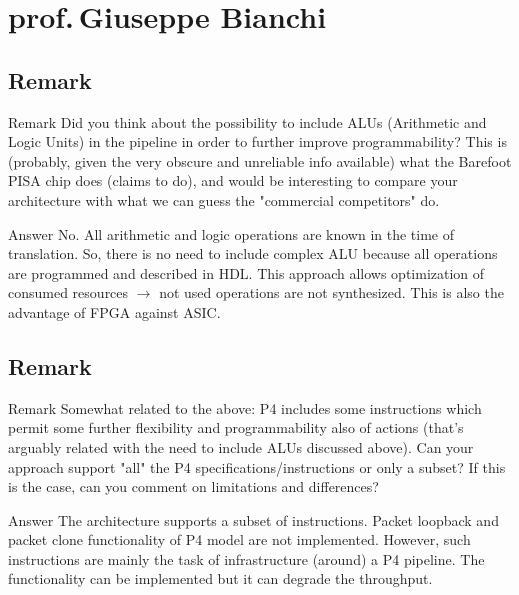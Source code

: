\section{prof.\,Giuseppe Bianchi}
\setcounter{RemarkCounter}{1}
\subsection{Remark \theRemarkCounter}
\begin{frame}[allowframebreaks]
    \begin{block}{Remark \theRemarkCounter}
        Did you think about the possibility to include ALUs (Arithmetic and Logic Units) in the
        pipeline in order to further improve programmability? This is (probably, given the very
        obscure and unreliable info available) what the Barefoot PISA chip does (claims to do), and
        would be interesting to compare your architecture with what we can guess the 
        "commercial competitors" do.
    \end{block}
    \begin{exampleblock}{Answer}
        No. All arithmetic and logic operations are known in the time of translation. So,
        there is no need to include complex ALU because all operations are programmed and described in HDL. 
        This approach allows optimization of consumed resources $\rightarrow$ not used operations are not synthesized.
        This is also the advantage of FPGA against ASIC.
    \end{exampleblock}
    
\end{frame}

\subsection{Remark \theRemarkCounter}
\begin{frame}[allowframebreaks]
    \begin{block}{Remark \theRemarkCounter}
        Somewhat related to the above: P4 includes some instructions which permit some further
        flexibility and programmability also of actions (that's arguably related with the need to
        include ALUs discussed above). Can your approach support "all" the P4
        specifications/instructions or only a subset? If this is the case, can you comment on
        limitations and differences?
    \end{block}
    
    \begin{exampleblock}{Answer}
        The architecture supports a subset of instructions. Packet loopback and packet clone functionality of P4 model are not implemented.
        However, such instructions are mainly the task of infrastructure (around) a P4 pipeline.
        The functionality can be implemented but it can degrade the throughput.
    \end{exampleblock}   
\end{frame}

